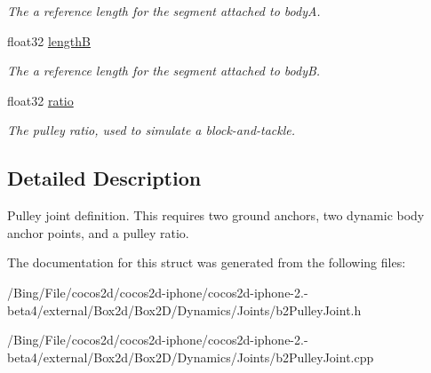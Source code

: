 \begin{DoxyCompactItemize}
\begin{DoxyCompactList}\small\item\em The a reference length for the segment attached to body\-A. \end{DoxyCompactList}\item 
\hypertarget{structb2_pulley_joint_def_a5857d5b5b9880b6c8201ce3ee8c3eef0}{float32 \hyperlink{structb2_pulley_joint_def_a5857d5b5b9880b6c8201ce3ee8c3eef0}{length\-B}}\label{structb2_pulley_joint_def_a5857d5b5b9880b6c8201ce3ee8c3eef0}

\begin{DoxyCompactList}\small\item\em The a reference length for the segment attached to body\-B. \end{DoxyCompactList}\item 
\hypertarget{structb2_pulley_joint_def_af35074246aeacbf239c11682642b31f5}{float32 \hyperlink{structb2_pulley_joint_def_af35074246aeacbf239c11682642b31f5}{ratio}}\label{structb2_pulley_joint_def_af35074246aeacbf239c11682642b31f5}

\begin{DoxyCompactList}\small\item\em The pulley ratio, used to simulate a block-\/and-\/tackle. \end{DoxyCompactList}\end{DoxyCompactItemize}


\subsection{Detailed Description}
Pulley joint definition. This requires two ground anchors, two dynamic body anchor points, and a pulley ratio. 

The documentation for this struct was generated from the following files\-:\begin{DoxyCompactItemize}
\item 
/\-Bing/\-File/cocos2d/cocos2d-\/iphone/cocos2d-\/iphone-\/2.-\/beta4/external/\-Box2d/\-Box2\-D/\-Dynamics/\-Joints/b2\-Pulley\-Joint.\-h\item 
/\-Bing/\-File/cocos2d/cocos2d-\/iphone/cocos2d-\/iphone-\/2.-\/beta4/external/\-Box2d/\-Box2\-D/\-Dynamics/\-Joints/b2\-Pulley\-Joint.\-cpp\end{DoxyCompactItemize}
